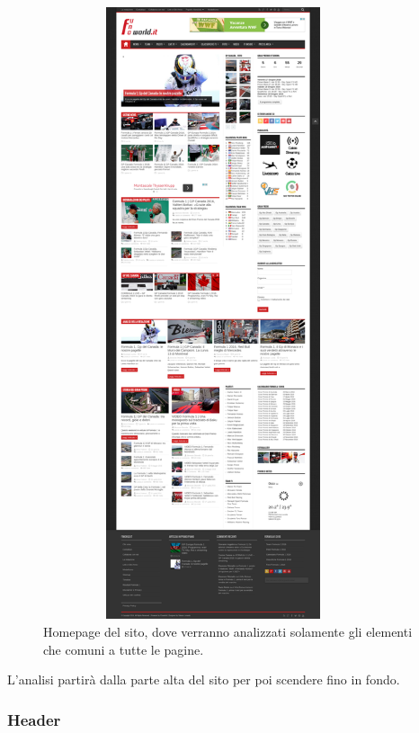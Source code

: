 \begin{figure}[H]
  \centering
  \includegraphics[height=18cm, width=10cm]{res/img/HomePage_Full}
  \caption{Homepage del sito, dove verranno analizzati solamente gli elementi
    che comuni a tutte le pagine.}
\end{figure}

L'analisi partir\`a dalla parte alta del sito per poi scendere fino in fondo.

\subsubsection{Header}

